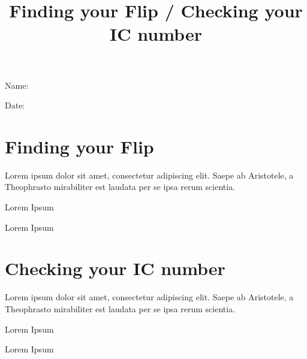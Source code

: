 \documentclass[a4paper,12pt]{article}
\title{Finding your Flip / Checking your IC number\vspace{-2cm}}
\date{}
\newcommand\Blank[2][.33\linewidth]{%
  \rule{0pt}{4ex}%
  #2\enspace
  \makebox[#1]{\hrulefill}}
\begin{document}
\maketitle
\begin{flushright}
  \Blank{Name:}

  \Blank{Date:}
\end{flushright}


\section{Finding your Flip}
Lorem ipsum dolor sit amet, consectetur adipiscing elit.   Saepe ab Aristotele,
a Theophrasto mirabiliter est laudata per se ipsa rerum scientia.  

\begin{question}
Lorem Ipsum
\end{question}

\begin{question}
Lorem Ipsum
\end{question}

\section{Checking your IC number}
Lorem ipsum dolor sit amet, consectetur adipiscing elit.   Saepe ab Aristotele,
a Theophrasto mirabiliter est laudata per se ipsa rerum scientia.  

\begin{question}
Lorem Ipsum
\end{question}

\begin{question}
Lorem Ipsum
\end{question}
\end{document}
